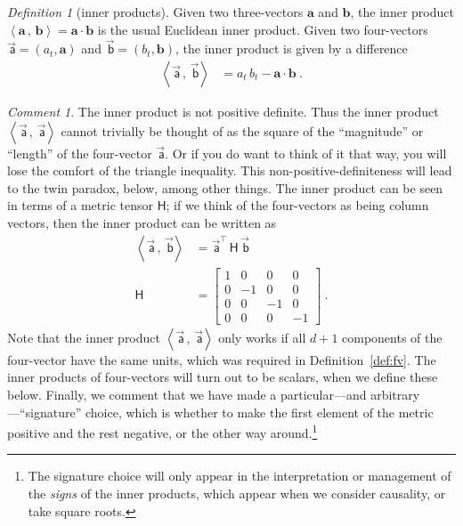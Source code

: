 \documentclass[10pt]{article}
\newcounter{par}
\theoremstyle{remark}
\newtheorem{definition}{Definition}
\newcommand{\defref}[1]{Definition~\ref{#1}}
\theoremstyle{remark}
\newtheorem*{remark}{Comment}
\newcommand{\metric}{\mathsf{H}}
\newcommand\upvec[1]{\!\vec{\,\mathrm{#1}}}
\newcommand{\tv}[1]{{\mathbf{#1}}} %
\newcommand{\fv}[1]{\upvec{\mathsf{#1}}} %
\newcommand{\inner}[2]{\left<{#1}\,,\,{#2}\right>}
\begin{document}
\begin{definition}[inner products]
    Given two three-vectors $\tv{a}$ and $\tv{b}$, the inner product $\inner{\tv{a}}{\tv{b}}=\tv{a}\cdot\tv{b}$ is the usual Euclidean inner product.
    Given two four-vectors $\fv{a}=(a_t,\tv{a})$ and $\fv{b}=(b_t,\tv{b})$, the inner product is given by a difference
    \begin{align}
        \inner{\fv{a}}{\fv{b}} &= a_t\,b_t - \tv{a}\cdot\tv{b} ~.
    \end{align}
\end{definition}
\begin{remark}
    The inner product is not positive definite.
    Thus the inner product $\inner{\fv{a}}{\fv{a}}$ cannot trivially be thought of as the square of the ``magnitude'' or ``length'' of the four-vector $\fv{a}$.
    Or if you do want to think of it that way, you will lose the comfort of the triangle inequality.
    This non-positive-definiteness will lead to the twin paradox, below, among other things.
    The inner product can be seen in terms of a metric tensor $\metric$; if we think of the four-vectors as being column vectors, then the inner product can be written as
    \begin{align}
        \inner{\fv{a}}{\fv{b}} &= \fv{a}^\top\,\metric\,\fv{b} \\
        \metric &= \begin{bmatrix}1 &  0 &  0 &  0\\
                                  0 & -1 &  0 &  0\\
                                  0 &  0 & -1 &  0\\
                                  0 &  0 &  0 & -1\end{bmatrix} ~.
    \end{align}
    Note that the inner product $\inner{\fv{a}}{\fv{a}}$ only works if all $d+1$ components of the four-vector have the same units, which was required in \defref{def:fv}.
    The inner products of four-vectors will turn out to be scalars, when we define these below.
    Finally, we comment that we have made a particular---and arbitrary---``signature'' choice, which is whether to make the first element of the metric positive and the rest negative, or the other way around.\footnote{The signature choice will only appear in the interpretation or management of the \emph{signs} of the inner products, which appear when we consider causality, or take square roots.}
\end{remark}
\end{document}
